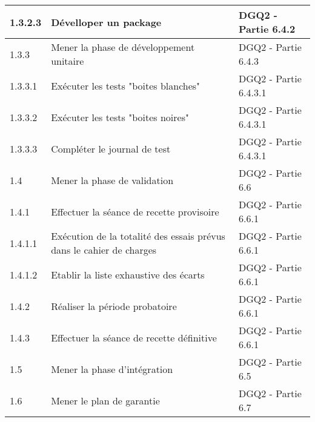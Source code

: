 \begin{center}
\begin{tabular}[h]{|p{}|p{}|p{}|}
        1.3.2.3 & Dévelloper un package & DGQ2 - Partie 6.4.2\\\hline
        1.3.3 & Mener la phase de développement unitaire & DGQ2 - Partie 6.4.3 \\\hline
        1.3.3.1 & Exécuter les tests "boites blanches" & DGQ2 - Partie 6.4.3.1 \\\hline
        1.3.3.2 & Exécuter les tests "boites noires" & DGQ2 - Partie 6.4.3.1 \\\hline
        1.3.3.3 & Compléter le journal de test & DGQ2 - Partie 6.4.3.1 \\\hline
        1.4 & Mener la phase de validation & DGQ2 - Partie 6.6 \\\hline
        1.4.1 & Effectuer la séance de recette provisoire & DGQ2 - Partie 6.6.1 \\\hline
        1.4.1.1 & Exécution de la totalité des essais prévus dans le cahier de charges & DGQ2 - Partie 6.6.1 \\\hline
        1.4.1.2 & Etablir la liste exhaustive des écarts & DGQ2 - Partie 6.6.1 \\\hline
        1.4.2 & Réaliser la période probatoire & DGQ2 - Partie 6.6.1 \\\hline
        1.4.3 & Effectuer la séance de recette définitive & DGQ2 - Partie 6.6.1 \\\hline
        
         1.5 & Mener la phase d'intégration & DGQ2 - Partie 6.5 \\\hline
         
		 1.6 & Mener le plan de garantie & DGQ2 - Partie 6.7\\\hline         
         
\end{tabular}
\end{center}


